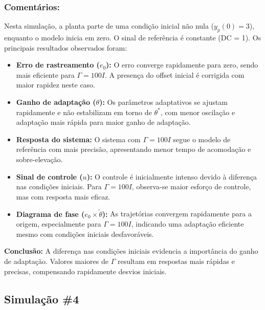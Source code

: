 \documentclass[10pt]{article}
\begin{document}
\subsubsection{Comentários:}

Nesta simulação, a planta parte de uma condição inicial não nula ($y_p(0) = 3$), enquanto o modelo inicia em zero. O sinal de referência é constante (DC = 1). Os principais resultados observados foram:

\begin{itemize}
    \item \textbf{Erro de rastreamento ($e_0$):} O erro converge rapidamente para zero, sendo mais eficiente para $\Gamma = 100I$. A presença do offset inicial é corrigida com maior rapidez neste caso.

    \item \textbf{Ganho de adaptação ($\theta$):} Os parâmetros adaptativos se ajustam rapidamente e não estabilizam em torno de $\theta^*$, com menor oscilação e adaptação mais rápida para maior ganho de adaptação.

    \item \textbf{Resposta do sistema:} O sistema com $\Gamma = 100I$ segue o modelo de referência com mais precisão, apresentando menor tempo de acomodação e sobre-elevação.

    \item \textbf{Sinal de controle ($u$):} O controle é inicialmente intenso devido à diferença nas condições iniciais. Para $\Gamma = 100I$, observa-se maior esforço de controle, mas com resposta mais eficaz.

    \item \textbf{Diagrama de fase ($e_0 \times \tilde{\theta}$):} As trajetórias convergem rapidamente para a origem, especialmente para $\Gamma = 100I$, indicando uma adaptação eficiente mesmo com condições iniciais desfavoráveis.

\end{itemize}

\textbf{Conclusão:} A diferença nas condições iniciais evidencia a importância do ganho de adaptação. Valores maiores de $\Gamma$ resultam em respostas mais rápidas e precisas, compensando rapidamente desvios iniciais.

\newpage

\subsection{Simulação \#4}
\end{document}
